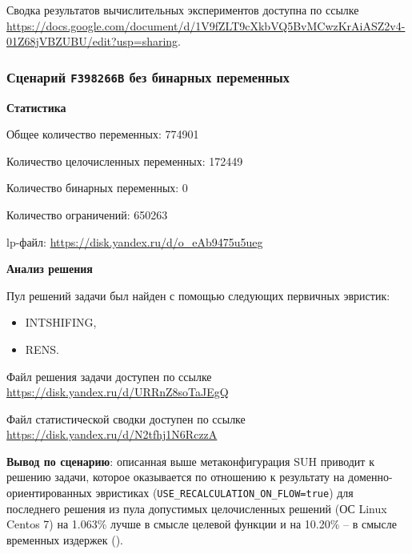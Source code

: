 \documentclass[%
	11pt,
	a4paper,
	utf8,
		]{article}
\begin{document}
Сводка результатов вычислительных экспериментов доступна по ссылке \url{https://docs.google.com/document/d/1V9fZLT9cXkbVQ5BvMCwzKrAiASZ2v4-01Z68jVBZUBU/edit?usp=sharing}.

\subsubsection{Сценарий \texttt{F398266B} без бинарных переменных}

\textbf{Статистика}\vspace*{1mm}

Общее количество переменных: 774901

Количество целочисленных переменных: 172449

Количество бинарных переменных: 0

Количество ограничений: 650263

lp-файл: \url{https://disk.yandex.ru/d/o_eAb9475u5ueg}

\vspace*{5mm}\textbf{Анализ решения}\vspace*{1mm}

Пул решений задачи был найден с помощью следующих первичных эвристик:
\begin{itemize}
	\item INTSHIFING,
	
	\item RENS.
\end{itemize}

Файл решения задачи доступен по ссылке \url{https://disk.yandex.ru/d/URRnZ8soTaJEgQ}

Файл статистической сводки доступен по ссылке \url{https://disk.yandex.ru/d/N2tfhj1N6RczzA}

\vspace*{3mm}
\textbf{Вывод по сценарию}: описанная выше метаконфигурация SUH приводит к решению задачи, которое оказывается по отношению к результату на доменно-ориентированных эвристиках (\verb|USE_RECALCULATION_ON_FLOW=true|) для последнего решения из пула допустимых целочисленных решений (ОС Linux Centos 7) на 1.063\% лучше в смысле целевой функции и на 10.20\% -- в смысле временных издержек ().
\end{document}
